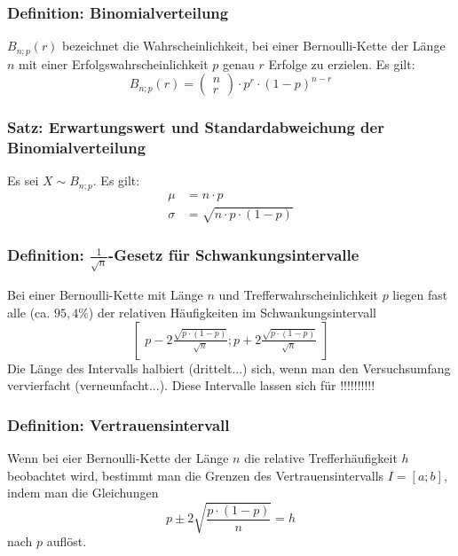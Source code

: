 \documentclass{article}
\begin{document}
  \subsubsection{Definition: Binomialverteilung}
  $B_{n;p}(r)$ bezeichnet die Wahrscheinlichkeit, bei einer Bernoulli-Kette der Länge $n$ mit einer Erfolgswahrscheinlichkeit $p$ genau $r$ Erfolge zu erzielen. Es gilt:
  \begin{equation*}
  	B_{n;p}(r) = 
  	\begin{pmatrix}
  		n \\
  		r
  	\end{pmatrix}
  	\cdot p^r\cdot (1-p)^{n-r}
  \end{equation*}
  
  \subsubsection{Satz: Erwartungswert und Standardabweichung der Binomialverteilung}
  Es sei $X \sim B_{n;p}$. Es gilt: 
  \begin{align*}
  	\mu &= n \cdot p \\
  	\sigma &= \sqrt{n \cdot p \cdot (1-p)}
  \end{align*}
  
  \subsubsection{Definition: $\frac{1}{\sqrt{n}}$-Gesetz für Schwankungsintervalle}
  Bei einer Bernoulli-Kette mit Länge $n$ und Trefferwahrscheinlichkeit $p$ liegen fast alle (ca. $95,4\%$) der relativen Häufigkeiten im Schwankungsintervall
  \begin{equation*}
  	\begin{bmatrix}
  		p - 2 \frac{\sqrt{p \cdot (1 - p)}}{\sqrt{n}}; p + 2 \frac{\sqrt{p \cdot (1 - p)}}{\sqrt{n}}
  	\end{bmatrix}
  \end{equation*}
  Die Länge des Intervalls halbiert (drittelt...) sich, wenn man den Versuchsumfang vervierfacht (verneunfacht...). Diese Intervalle lassen sich für !!!!!!!!!!
  
  \subsubsection{Definition: Vertrauensintervall}
  Wenn bei eier Bernoulli-Kette der Länge $n$ die relative Trefferhäufigkeit $h$ beobachtet wird, bestimmt man die Grenzen des Vertrauensintervalls $I = [a;b]$, indem man die Gleichungen
  \begin{equation*}
  	p \pm 2 \sqrt{\frac{p \cdot (1 - p)}{n}} = h
  \end{equation*}
  nach $p$ auflöst.
  
\end{document}
